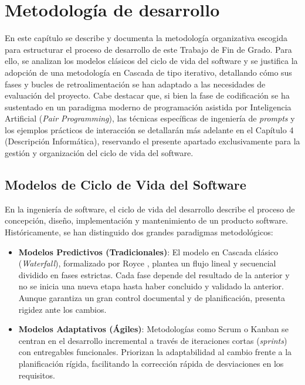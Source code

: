 \chapter{Metodología de desarrollo}
\label{chap:metodologia}

En este capítulo se describe y documenta la metodología organizativa escogida para estructurar el proceso de desarrollo de este Trabajo de Fin de Grado. Para ello, se analizan los modelos clásicos del ciclo de vida del software y se justifica la adopción de una metodología en Cascada de tipo iterativo, detallando cómo sus fases y bucles de retroalimentación se han adaptado a las necesidades de evaluación del proyecto. Cabe destacar que, si bien la fase de codificación se ha sustentado en un paradigma moderno de programación asistida por Inteligencia Artificial (\textit{Pair Programming}), las técnicas específicas de ingeniería de \textit{prompts} y los ejemplos prácticos de interacción se detallarán más adelante en el Capítulo 4 (Descripción Informática), reservando el presente apartado exclusivamente para la gestión y organización del ciclo de vida del software.


\section{Modelos de Ciclo de Vida del Software}
\label{sec:modelos_ciclo_vida}

En la ingeniería de software, el ciclo de vida del desarrollo describe el proceso de concepción, diseño, implementación y mantenimiento de un producto software. Históricamente, se han distinguido dos grandes paradigmas metodológicos:

\begin{itemize}
    \item \textbf{Modelos Predictivos (Tradicionales)}: El modelo en Cascada clásico (\textit{Waterfall}), formalizado por Royce \cite{royce_waterfall}, plantea un flujo lineal y secuencial dividido en fases estrictas. Cada fase depende del resultado de la anterior y no se inicia una nueva etapa hasta haber concluido y validado la anterior. Aunque garantiza un gran control documental y de planificación, presenta rigidez ante los cambios.
    \item \textbf{Modelos Adaptativos (Ágiles)}: Metodologías como Scrum \cite{schwaber_scrum} o Kanban se centran en el desarrollo incremental a través de iteraciones cortas (\textit{sprints}) con entregables funcionales. Priorizan la adaptabilidad al cambio frente a la planificación rígida, facilitando la corrección rápida de desviaciones en los requisitos.
\end{itemize}

